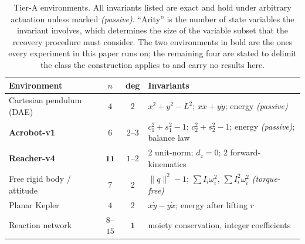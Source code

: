 \documentclass{article}
\begin{document}
\begin{table}[t]
\caption{Tier-A environments. All invariants listed are exact and hold under
arbitrary actuation unless marked \emph{(passive)}. ``Arity'' is the number of
state variables the invariant involves, which determines the size of the
variable subset that the recovery procedure must consider. The two environments in bold are the ones every
experiment in this paper runs on; the remaining four are stated to delimit the
class the construction applies to and carry no results here.}
\label{tab:tierA}
\begin{center}
\small
\begin{tabular}{lccl}
Environment & $n$ & deg & Invariants \\
\hline
Cartesian pendulum (DAE) & $4$ & $2$
  & $x^2{+}y^2{-}L^2$; $x\dot x{+}y\dot y$; energy \emph{(passive)} \\
\textbf{Acrobot-v1} & $6$ & $2$--$3$
  & $c_1^2{+}s_1^2{-}1$; $c_2^2{+}s_2^2{-}1$; energy \emph{(passive)};
    balance law \\
\textbf{Reacher-v4} & $\mathbf{11}$ & $1$--$2$
  & 2 unit-norm; $d_z{=}0$; 2 forward-kinematics \\
Free rigid body / attitude & $7$ & $2$
  & $\|q\|^2{-}1$; $\sum I_i\omega_i^2$, $\sum I_i^2\omega_i^2$
    \emph{(torque-free)} \\
Planar Kepler & $4$ & $2$
  & $x\dot y{-}y\dot x$; energy after lifting $r$ \\
Reaction network & $8$--$15$ & $\mathbf{1}$
  & moiety conservation, integer coefficients \\
\end{tabular}
\end{center}
\end{table}
\end{document}
